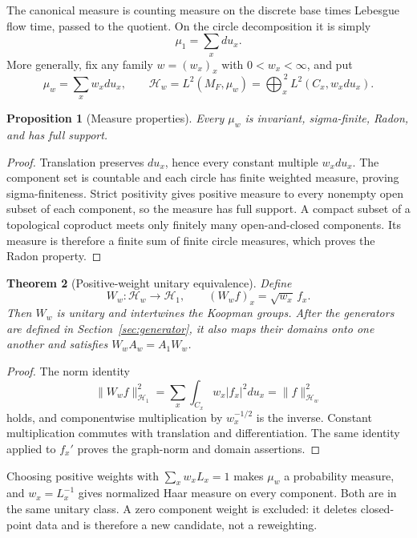 \documentclass[11pt]{article}
\newtheorem{theorem}{Theorem}
\newtheorem{proposition}[theorem]{Proposition}
\theoremstyle{definition}
\theoremstyle{remark}
\newcommand{\Hh}{\mathcal{H}}
\begin{document}
The canonical measure is counting measure on the discrete base times
Lebesgue flow time, passed to the quotient.  On the circle decomposition it
is simply
\[
 \mu_1=\sum_xdu_x.
\]
More generally, fix any family \(w=(w_x)_x\) with
\(0<w_x<\infty\), and put
\begin{equation}
 \mu_w=\sum_xw_xdu_x,
 \qquad
 \Hh_w=L^2(M_F,\mu_w)
 =\bigoplus_x^{\,2}L^2(C_x,w_xdu_x).
 \label{eq:weighted-space}
\end{equation}

\begin{proposition}[Measure properties]
\label{prop:measure}
Every \(\mu_w\) is invariant, sigma-finite, Radon, and has full support.
\end{proposition}

\begin{proof}
Translation preserves \(du_x\), hence every constant multiple
\(w_xdu_x\).  The component set is countable and each circle has finite
weighted measure, proving sigma-finiteness.  Strict positivity gives positive
measure to every nonempty open subset of each component, so the measure has
full support.  A compact subset of a topological coproduct meets only finitely
many open-and-closed components.  Its measure is therefore a finite sum of
finite circle measures, which proves the Radon property.
\end{proof}

\begin{theorem}[Positive-weight unitary equivalence]
\label{thm:weight-equivalence}
Define
\begin{equation}
 W_w:\Hh_w\longrightarrow\Hh_1,
 \qquad (W_wf)_x=\sqrt{w_x}\,f_x.
 \label{eq:weight-intertwiner}
\end{equation}
Then \(W_w\) is unitary and intertwines the Koopman groups.  After the
generators are defined in Section~\ref{sec:generator}, it also maps their
domains onto one another and satisfies \(W_wA_w=A_1W_w\).
\end{theorem}

\begin{proof}
The norm identity
\[
 \|W_wf\|_{\Hh_1}^2
 =\sum_x\int_{C_x}w_x|f_x|^2du_x
 =\|f\|_{\Hh_w}^2
\]
holds, and componentwise multiplication by \(w_x^{-1/2}\) is the inverse.
Constant multiplication commutes with translation and differentiation.  The
same identity applied to \(f_x'\) proves the graph-norm and domain assertions.
\end{proof}

Choosing positive weights with \(\sum_xw_xL_x=1\) makes \(\mu_w\) a
probability measure, and \(w_x=L_x^{-1}\) gives normalized Haar measure on
every component.  Both are in the same unitary class.  A zero component
weight is excluded: it deletes closed-point data and is therefore a new
candidate, not a reweighting.
\end{document}

